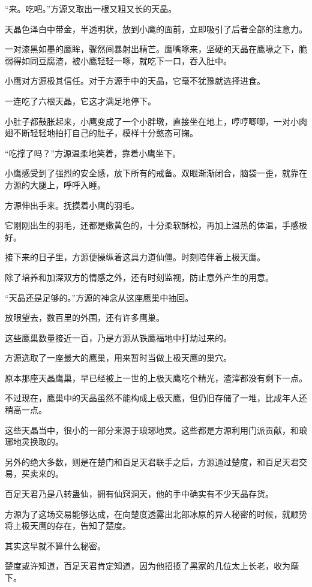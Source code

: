 \begin{this_body}
“来。吃吧。”方源又取出一根又粗又长的天晶。

天晶色泽白中带金，半透明状，放到小鹰的面前，立即吸引了后者全部的注意力。

一对漆黑如墨的鹰眸，骤然间暴射出精芒。鹰嘴啄来，坚硬的天晶在鹰喙之下，脆弱得如同豆腐渣，被小鹰轻轻一啄，就吃下一口，吞入肚中。

小鹰对方源极其信任。对于方源手中的天晶，它毫不犹豫就选择进食。

一连吃了六根天晶，它这才满足地停下。

小肚子都鼓胀起来，小鹰变成了一个小胖墩，直接坐在地上，哼哼唧唧，一对小肉翅不断轻轻地拍打自己的肚子，模样十分憨态可掬。

“吃撑了吗？”方源温柔地笑着，靠着小鹰坐下。

小鹰感受到了强烈的安全感，放下所有的戒备。双眼渐渐闭合，脑袋一歪，就靠在方源的大腿上，呼呼入睡。

方源伸出手来。抚摸着小鹰的羽毛。

它刚刚出生的羽毛，还都是嫩黄色的，十分柔软酥松，再加上温热的体温，手感极好。

接下来的日子里，方源便操纵着这具力道仙僵。时刻陪伴着上极天鹰。

除了培养和加深双方的情感之外，还有时刻监视，防止意外产生的用意。

“天晶还是足够的。”方源的神念从这座鹰巢中抽回。

放眼望去，数百里的外围，还有许多鹰巢。

这些鹰巢数量接近一百，乃是方源从铁鹰福地中打劫过来的。

方源选取了一座最大的鹰巢，用来暂时当做上极天鹰的巢穴。

原本那座天晶鹰巢，早已经被上一世的上极天鹰吃个精光，渣滓都没有剩下一点。

不过现在，鹰巢中的天晶虽然不能构成上极天鹰，但仍旧存储了一堆，比成年人还稍高一点。

这些天晶当中，很小的一部分来源于琅琊地灵。这些都是方源利用门派贡献，和琅琊地灵换取的。

另外的绝大多数，则是在楚门和百足天君联手之后，方源通过楚度，和百足天君交易，买卖来的。

百足天君乃是八转蛊仙，拥有仙窍洞天，他的手中确实有不少天晶存货。

方源为了这场交易能够达成，在向楚度透露出北部冰原的异人秘密的时候，就顺势将上极天鹰的存在，告知了楚度。

其实这早就不算什么秘密。

楚度或许知道，百足天君肯定知道，因为他招揽了黑家的几位太上长老，收为麾下。


\end{this_body}
